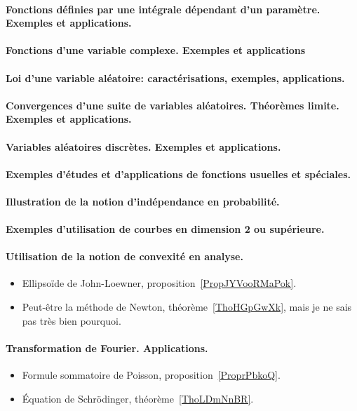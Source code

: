\paragraph{Fonctions définies par une intégrale dépendant d'un paramètre. Exemples et applications.}
\paragraph{Fonctions d'une variable complexe. Exemples et applications}
\paragraph{Loi d'une variable aléatoire: caractérisations, exemples, applications.}
\paragraph{Convergences d'une suite de variables aléatoires. Théorèmes limite. Exemples et applications.}
\paragraph{Variables aléatoires discrètes. Exemples et applications.}
\paragraph{Exemples d'études et d'applications de fonctions usuelles et spéciales.}
\paragraph{Illustration de la notion d'indépendance en probabilité.}
\paragraph{Exemples d'utilisation de courbes en dimension 2 ou supérieure.}


\paragraph{Utilisation de la notion de convexité en analyse.}
\begin{itemize}
    \item Ellipsoïde de John-Loewner, proposition~\ref{PropJYVooRMaPok}.
    \item Peut-être la méthode de Newton, théorème~\ref{ThoHGpGwXk}, mais je ne sais pas très bien pourquoi.
\end{itemize}
\paragraph{Transformation de Fourier. Applications.}
\begin{itemize}
    \item Formule sommatoire de Poisson, proposition~\ref{ProprPbkoQ}.
    \item Équation de Schrödinger, théorème~\ref{ThoLDmNnBR}.
\end{itemize}
